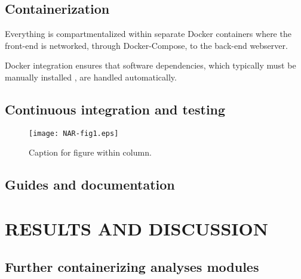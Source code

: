 \documentclass[a4,center,fleqn]{NAR}
\begin{document}
\subsection{Containerization}

Everything is compartmentalized within separate Docker containers where the front-end is networked, through Docker-Compose, to the back-end webserver.

Docker integration ensures that software dependencies, which typically must be manually installed \cite{doi:10.1093/bioinformatics/btu153,laing2010pan,inouye2014srst2}, are handled automatically.



\subsection{Continuous integration and testing}

\begin{figure}[t]
\begin{center}
\texttt{[image: NAR-fig1.eps]}
\end{center}
\caption{Caption for figure within column.}
\label{NAR-fig1}
\end{figure}

\subsection{Guides and documentation}

\section{RESULTS AND DISCUSSION}

\subsection{Further containerizing analyses modules}

\end{document}

